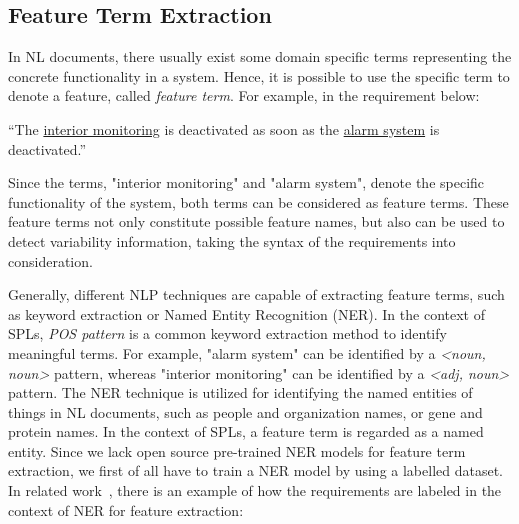 \documentclass[graybox]{svmult}
\begin{document}



\subsection{Feature Term Extraction}
\label{subsec:FTE}
In NL documents, there usually exist some domain specific terms representing the concrete functionality in a system. Hence, it is possible to use the specific term to denote a feature, called \textit{feature term}.
For example, in the requirement below:

\vspace{2mm}
\begin{mdframed}[style=mystyle]
``The \uline{interior monitoring} is deactivated as soon as the \uline{alarm system} is deactivated.''
\end{mdframed}
\vspace{4mm}

Since the terms, "interior monitoring" and "alarm system", denote the specific functionality of the system, both terms can be considered as feature terms. These feature terms not only constitute possible feature names, but also can be used to detect variability information, taking the syntax of the requirements into consideration. 

Generally, different NLP techniques are capable of extracting feature terms, such as keyword extraction or Named Entity Recognition (NER). In the context of SPLs, \textit{POS pattern} is a common keyword extraction method to identify meaningful terms.
For example, "alarm system" can be identified by a \textit{<noun, noun>} pattern, whereas "interior monitoring" can be identified by a \textit{<adj, noun>} pattern. 
The NER technique is utilized for identifying the named entities of things in NL documents, such as people and organization names, or gene and protein names. In the context of SPLs, a feature term is regarded as a named entity. Since we lack open source pre-trained NER models for feature term extraction, we first of all have to train a NER model by using a labelled dataset. In related work~\cite{BagheriEG12}, there is an example of how the requirements are labeled in the context of NER for feature extraction:
\end{document}

